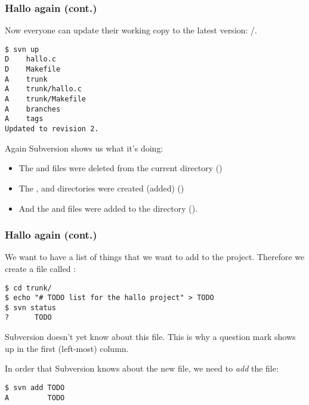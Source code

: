\begin{frame}[fragile]
    \frametitle{Hallo again (cont.)}
    \linuxframe

    Now everyone can update their working copy to the latest version:
    /.

    \begin{lstlisting}[basicstyle=\tiny\ttfamily\color{black}]
$ svn up
D    hallo.c
D    Makefile
A    trunk
A    trunk/hallo.c
A    trunk/Makefile
A    branches
A    tags
Updated to revision 2.
\end{lstlisting}

    Again Subversion shows us what it's doing:
    \begin{itemize}
        \item The  and  files were
            deleted from the current directory ()
        \item The ,  and 
            directories were created (added) ()
        \item And the  and  files were
            added to the  directory ().
    \end{itemize}
\end{frame}

\begin{frame}[fragile]
    \frametitle{Hallo again (cont.)}
    \linuxframe

We want to have a list of things that we want to add to the 
project.  Therefore we create a file called :
\begin{lstlisting}
$ cd trunk/
$ echo "# TODO list for the hallo project" > TODO
$ svn status
?      TODO
\end{lstlisting}

Subversion doesn't yet know about this file.  This is why a question mark
shows up in the first (left-most) column.

In order that Subversion knows about the new file, we need to \emph{add} the
file:
\begin{lstlisting}
$ svn add TODO
A         TODO
\end{lstlisting}
\end{frame}

